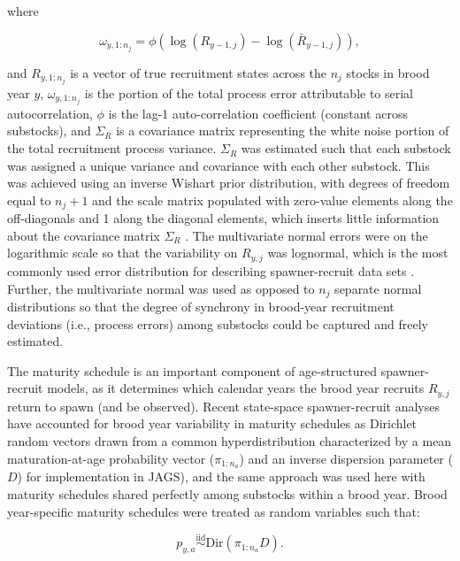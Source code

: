 \documentclass[12pt,]{book}
\theoremstyle{definition}
\theoremstyle{definition}
\theoremstyle{definition}
\theoremstyle{remark}
\begin{document}
\noindent
where

\begin{equation}
  \omega_{y,1:n_j} = \phi \left(\log(R_{y-1,j}) - \log(\bar{R}_{y-1,j}) \right),
  \label{eq:tsm-omega}
\end{equation}

\noindent
and \(R_{y,1:n_j}\) is a vector of true recruitment states across the
\(n_j\) stocks in brood year \(y\), \(\omega_{y,1:n_j}\) is the portion
of the total process error attributable to serial autocorrelation,
\(\phi\) is the lag-1 auto-correlation coefficient (constant across
substocks), and \(\Sigma_R\) is a covariance matrix representing the
white noise portion of the total recruitment process variance.
\(\Sigma_R\) was estimated such that each substock was assigned a unique
variance and covariance with each other substock. This was achieved
using an inverse Wishart prior distribution, with degrees of freedom
equal to \(n_j + 1\) and the scale matrix populated with zero-value
elements along the off-diagonals and 1 along the diagonal elements,
which inserts little information about the covariance matrix
\(\Sigma_R\) \citep{plummer-2017}. The multivariate normal errors were
on the logarithmic scale so that the variability on \(R_{y,j}\) was
lognormal, which is the most commonly used error distribution for
describing spawner-recruit data sets \citep{walters-martell-2004}.
Further, the multivariate normal was used as opposed to \(n_j\) separate
normal distributions so that the degree of synchrony in brood-year
recruitment deviations (i.e., process errors) among substocks could be
captured and freely estimated.

The maturity schedule is an important component of age-structured
spawner-recruit models, as it determines which calendar years the brood
year recruits \(R_{y,j}\) return to spawn (and be observed). Recent
state-space spawner-recruit analyses have accounted for brood year
variability in maturity schedules as Dirichlet random vectors drawn from
a common hyperdistribution characterized by a mean maturation-at-age
probability vector (\(\pi_{1:n_a}\)) and an inverse dispersion parameter
(\(D\)) \citep[see][]{fleischman-etal-2013, staton-etal-2017-intseq} for
implementation in JAGS), and the same approach was used here with
maturity schedules shared perfectly among substocks within a brood year.
Brood year-specific maturity schedules were treated as random variables
such that:

\begin{equation}
  p_{y,a} \stackrel{\text{iid}}{\sim} \text{Dir}(\pi_{1:n_a} D). 
  \label{eq:dirichlet}
\end{equation}
\end{document}
